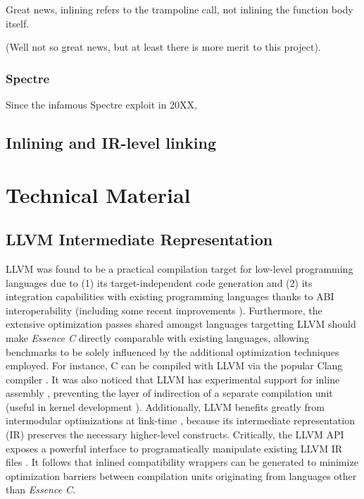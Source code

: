 \documentclass[12pt,a4paper,twoside]{report}
\begin{document}
Great news, inlining refers to the trampoline call, not inlining the function body itself.

(Well not so great news, but at least there is more merit to this project).

\subsubsection{Spectre}

Since the infamous Spectre exploit in 20XX, 

\subsection{Inlining and IR-level linking}

\section{Technical Material}

\subsection{LLVM Intermediate Representation}

LLVM was found to be a practical compilation target for low-level programming languages due to (1) its target-independent code generation \cite{llvmcodegen} and (2) its integration capabilities with existing programming languages thanks to ABI interoperability (including some recent improvements \cite{llvminterop}). Furthermore, the extensive optimization passes shared amongst languages targetting LLVM \cite{llvmoptim} should make \textit{Essence C} directly comparable with existing languages, allowing benchmarks to be solely influenced by the additional optimization techniques employed. For instance, C can be compiled with LLVM via the popular Clang compiler \cite{llvmclang}. It was also noticed that LLVM has experimental support for inline assembly \cite{llvmasm}, preventing the layer of indirection of a separate compilation unit (useful in kernel development \cite{inlinekern}). Additionally, LLVM benefits greatly from intermodular optimizations at link-time \cite{llvmlto}, because its intermediate representation (IR) preserves the necessary higher-level constructs. Critically, the LLVM API exposes a powerful interface to programatically manipulate existing LLVM IR files \cite{llvmtransformations} \cite{llvmpasses}. It follows that inlined compatibility wrappers can be generated to minimize optimization barriers between compilation units originating from languages other than \textit{Essence C}.
\end{document}
